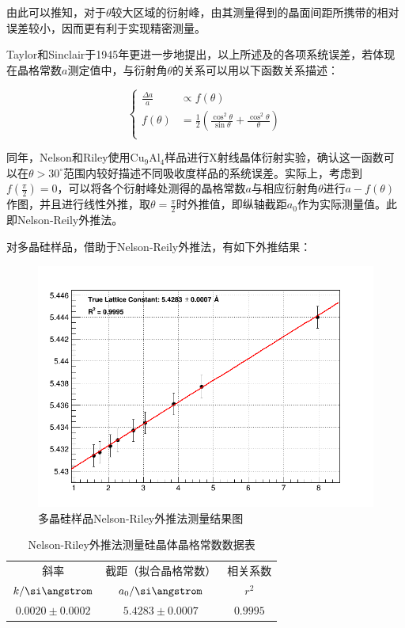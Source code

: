 \documentclass{thuemp}
\begin{document}
由此可以推知，对于$\theta$较大区域的衍射峰，由其测量得到的晶面间距所携带的相对误差较小，因而更有利于实现精密测量。

Taylor和Sinclair于1945年更进一步地提出，以上所述及的各项系统误差，若体现在晶格常数$a$测定值中，与衍射角$\theta$的关系可以用以下函数关系描述：

\begin{equation}
    \begin{cases}
        \frac{\Delta a}{a} & \propto f(\theta) \\
        f(\theta) & = \frac{1}{2} \left(\frac{\cos^2\theta}{\sin\theta} + \frac{\cos^2\theta}{\theta}\right) \\
    \end{cases}
\end{equation}

同年，Nelson和Riley使用$\text{Cu}_9\text{Al}_4$样品进行X射线晶体衍射实验，确认这一函数可以在$\theta > 30^\circ$范围内较好描述不同吸收度样品的系统误差。实际上，考虑到$f\left(\frac{\pi}{2}\right) = 0$，可以将各个衍射峰处测得的晶格常数$a$与相应衍射角$\theta$进行$a-f(\theta)$作图，并且进行线性外推，取$\theta=\frac{\pi}{2}$时外推值，即纵轴截距$a_0$作为实际测量值。此即Nelson-Reily外推法。

对多晶硅样品，借助于Nelson-Reily外推法，有如下外推结果：

\begin{figure}[H]
    \centering
    \includegraphics[width=0.8\linewidth]{../Data/Fit_si.png}
    \caption{多晶硅样品Nelson-Riley外推法测量结果图}
    \label{fig:si_xrd_extrapol}
\end{figure}

\begin{table}[H]
    \centering
    \captionnamefont{\wuhao\bf\heiti}
    \captiontitlefont{\wuhao\bf\heiti}
    \caption{Nelson-Riley外推法测量硅晶体晶格常数数据表}
    \label{tab:si_xrd_extrapol}
    \liuhao
    \begin{tabular}{ccc}
        \toprule
        斜率 & 截距（拟合晶格常数） & 相关系数 \\
        $k/\text{\si\angstrom}$ & $a_0/\text{\si\angstrom}$ & $r^2$ \\
        \midrule
        $0.0020 \pm 0.0002$ & $5.4283 \pm 0.0007$ & $0.9995$ \\
        \bottomrule
    \end{tabular}
\end{table}
\end{document}
